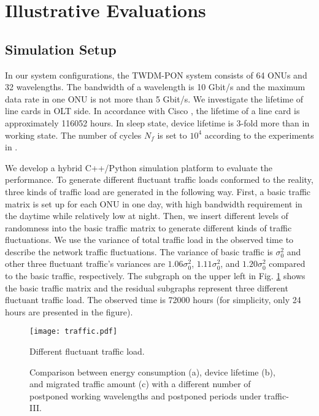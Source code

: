 \documentclass[letter]{IEEEtran}
\begin{document}
\section{Illustrative Evaluations}
\subsection{Simulation Setup}
In our system configurations, the TWDM-PON system consists of 64 ONUs and 32 wavelengths. The bandwidth of a wavelength is 10 Gbit/s and the maximum data rate in one ONU is not more than 5 Gbit/s. We investigate the lifetime of line cards in OLT side. In accordance with Cisco \cite{cisco}, the lifetime of a line card is approximately 116052 hours. In sleep state, device lifetime is 3-fold more than in working state. The number of cycles $ N_{f} $ is set to $ 10^{4}$ according to the experiments in \cite{toshiba}\cite{ghaffarian2000accelerated}. 

We develop a hybrid C++/Python simulation platform to evaluate the performance. To generate different fluctuant traffic loads conformed to the reality, three kinds of traffic load are generated in the following way. First, a basic traffic matrix is set up for each ONU in one day, with high bandwidth requirement in the daytime while relatively low at night. Then, we insert different levels of randomness into the basic traffic matrix to generate different kinds of traffic fluctuations. We use the variance of total traffic load in the observed time to describe the network traffic fluctuations. The variance of basic traffic is $ \sigma_{0}^{2} $ and other three fluctuant traffic's variances are $ 1.06\sigma_{0}^{2} $,  $ 1.11\sigma_{0}^{2} $, and  $ 1.20\sigma_{0}^{2} $ compared to the basic traffic, respectively. The subgraph on the upper left in Fig. \ref{traffic} shows the basic traffic matrix and the residual subgraphs represent three different fluctuant traffic load. The observed time is 72000 hours (for simplicity, only 24 hours are presented in the figure).

\begin{figure}[t]
  \centering 
  \texttt{[image: traffic.pdf]}\\ 
  \caption{ Different fluctuant traffic load.}
  \label{traffic}
  \vspace{-6.0mm}
\end{figure}

\begin{figure*}[h]
	\setlength{\abovecaptionskip}{-1.0mm}
    \centering 
    \caption{Comparison between energy consumption (a), device lifetime (b), and migrated traffic amount (c) with a different number of postponed working wavelengths and postponed periods under traffic-III.} 
    \label{numerical} 
    \vspace{-5.0mm}
\end{figure*}
\end{document}
